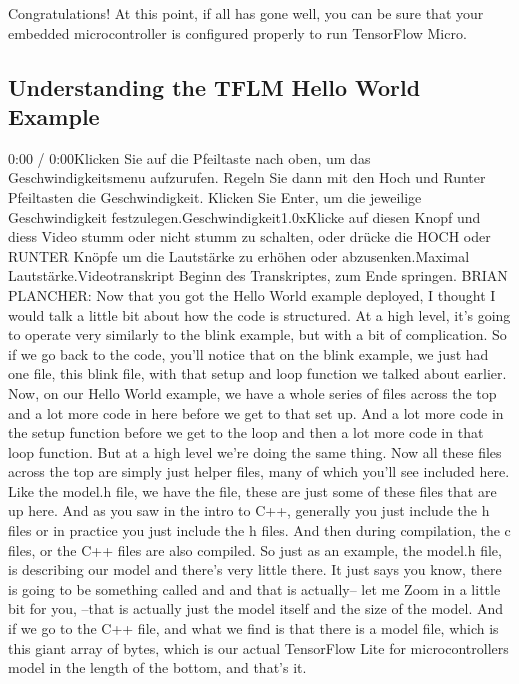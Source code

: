Congratulations! At this point, if all has gone well, you can be sure that your embedded microcontroller is configured properly to run TensorFlow Micro.

\subsection{Understanding the TFLM Hello World Example}

0:00 / 0:00Klicken Sie auf die Pfeiltaste nach oben, um das Geschwindigkeitsmenu aufzurufen. Regeln Sie dann mit den Hoch und Runter Pfeiltasten die Geschwindigkeit. Klicken Sie Enter, um die jeweilige Geschwindigkeit festzulegen.Geschwindigkeit1.0xKlicke auf diesen Knopf und diess Video stumm oder nicht stumm zu schalten, oder drücke die HOCH oder RUNTER Knöpfe um die Lautstärke zu erhöhen oder abzusenken.Maximal Lautstärke.Videotranskript
Beginn des Transkriptes, zum Ende springen.
BRIAN PLANCHER: Now that you got the Hello World example deployed,
I thought I would talk a little bit about how the code is structured.
At a high level, it's going to operate very similarly to the blink example,
but with a bit of complication.
So if we go back to the code, you'll notice that on the blink example,
we just had one file, this blink file, with that setup
and loop function we talked about earlier.
Now, on our Hello World example, we have a whole series
of files across the top and a lot more code in here
before we get to that set up.
And a lot more code in the setup function
before we get to the loop and then a lot more code in that loop function.
But at a high level we're doing the same thing.
Now all these files across the top are simply just helper files, many of which
you'll see included here.
Like the model.h file, we have the  file,
these are just some of these files that are up here.
And as you saw in the intro to C++, generally you just include the h files
or in practice you just include the h files.
And then during compilation, the c files,
or the C++ files are also compiled.
So just as an example, the model.h file, is describing our model
and there's very little there.
It just says you know, there is going to be something
called  and  and that is actually--
let me Zoom in a little bit for you, --that
is actually just the model itself and the size of the model.
And if we go to the C++ file, and what we find is that there is a model file,
which is this giant array of bytes, which is our actual TensorFlow Lite
for microcontrollers model in the length of the bottom, and that's it.
